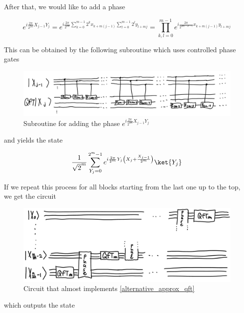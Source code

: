 After that, we would like to add a phase

\begin{equation*}
    e^{i\frac{2\pi}{2^{2m}}X_{j-1}Y_{j}} = e^{i\frac{2\pi}{2^{2m}}\sum_{k=0}^{m-1}2^kx_{k+m(j-1)}\sum_{l=0}^{m-1}2^ly_{l + mj}} = \prod_{k,l=0}^{m-1}e^{i\frac{2\pi}{2^{2m-k-l}}x_{k+m(j-1)}y_{l+mj}}    
\end{equation*}

This can be obtained by the following subroutine which uses controlled phase gates

\begin{figure}[H]
    \centering
    \includegraphics*[scale=0.2]{images/phase_circuit.jpg}
    \caption{Subroutine for adding the phase $e^{i\frac{2\pi}{2^{2m}}X_{j-1}Y_{j}}$}
    \label{phase_circuit}
\end{figure}

and yields the state 

\begin{equation*}
    \frac{1}{\sqrt{2}^m}\sum_{Y_{j}=0}^{2^m-1}e^{i\frac{2\pi}{2^m}Y_{j}\left(X_{j} + \frac{X_{j-1}}{2^m}\right)}\ket{Y_{j}}
\end{equation*}

If we repeat this process for all blocks starting from the last one up to the top, we get the circuit

\begin{figure}[H]
    \centering
    \includegraphics*[scale=0.18]{images/almost_approx_circuit.jpg}
    \caption{Circuit that almost implements \ref{alternative_approx_qft}}
    \label{almost_approx_circuit}
\end{figure}

which outputs the state

